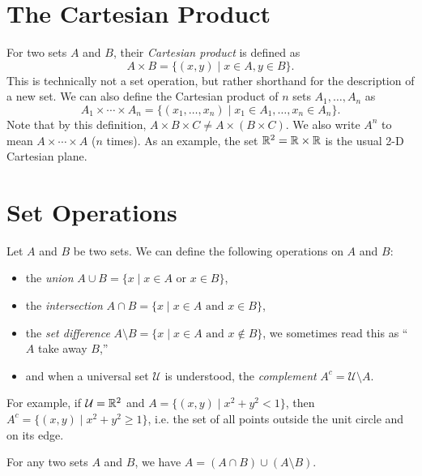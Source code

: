 \section{The Cartesian Product}
For two sets $A$ and $B$, their \emph{Cartesian product}
is defined as
\[A \times B = \{(x, y) \mid x \in A, y \in B\}.\]
This is technically not a set operation, but rather
shorthand for the description of a new set. We can also
define the Cartesian product of $n$ sets
$A_1, \dots, A_n$ as
\[
  A_1 \times \cdots \times A_n
  = \{(x_1, \dots, x_n) \mid x_1 \in A_1, \dots, x_n \in A_n\}.
\]
Note that by this definition,
$A \times B \times C \ne A \times (B \times C)$.
We also write $A^n$ to mean $A \times \cdots \times A$
($n$ times).
As an example, the set $\mathbb{R}^2 = \mathbb{R} \times \mathbb{R}$ is the
usual 2-D Cartesian plane.

\section{Set Operations}
Let $A$ and $B$ be two sets. We can define the following
operations on $A$ and $B$:
\begin{itemize}
  \item the \emph{union} $A \cup B = \{x \mid x \in A \text{ or } x \in B\}$,
  \item the \emph{intersection} $A \cap B = \{x \mid x \in A \text{ and } x \in B\}$,
  \item the \emph{set difference} $A \setminus B = \{x \mid x \in A \text{ and } x \notin B\}$,
    we sometimes read this as ``$A$ take away $B$,''
  \item and when a universal set $\mathcal{U}$ is
    understood, the \emph{complement}
    $A^c = \mathcal{U} \setminus A$.
\end{itemize}
For example, if $\mathcal{U} = \mathbb{R}^2$ and $A = \{(x, y) \mid x^2 + y^2 < 1\}$,
then $A^c = \{(x, y) \mid x^2 + y^2 \geq 1\}$, i.e.
the set of all points outside the unit circle and on
its edge.

\begin{tcolorbox}
\begin{prop}
  For any two sets $A$ and $B$, we have
  $A = (A \cap B) \cup (A \setminus B)$.
\end{prop}
\end{tcolorbox}


